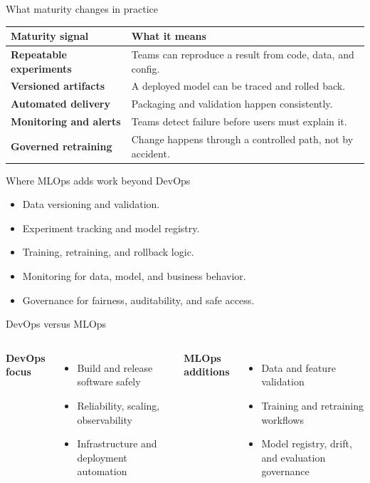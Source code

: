 \begin{frame}{What maturity changes in practice}
\begin{tabularx}{\textwidth}{>{\bfseries}l X}
Maturity signal & What it means \\
\toprule
Repeatable experiments & Teams can reproduce a result from code, data, and config. \\
Versioned artifacts & A deployed model can be traced and rolled back. \\
Automated delivery & Packaging and validation happen consistently. \\
Monitoring and alerts & Teams detect failure before users must explain it. \\
Governed retraining & Change happens through a controlled path, not by accident. \\
\bottomrule
\end{tabularx}
\coursefooter
\end{frame}

\begin{frame}{Where MLOps adds work beyond DevOps}
\begin{itemize}
\item Data versioning and validation.
\item Experiment tracking and model registry.
\item Training, retraining, and rollback logic.
\item Monitoring for data, model, and business behavior.
\item Governance for fairness, auditability, and safe access.
\end{itemize}
\coursefooter
\end{frame}

\begin{frame}{DevOps versus MLOps}
\begin{columns}[T]
\textbf{DevOps focus}
\begin{itemize}
\item Build and release software safely
\item Reliability, scaling, observability
\item Infrastructure and deployment automation
\end{itemize}
\textbf{MLOps additions}
\begin{itemize}
\item Data and feature validation
\item Training and retraining workflows
\item Model registry, drift, and evaluation governance
\end{itemize}
\end{columns}
\coursefooter
\end{frame}

